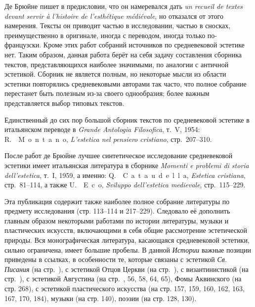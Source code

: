 Де Брюйне пишет в предисловии, что он намеревался дать \emph{un recueil de textes devant servir à l’histoire de l’esthétique médiévale}, но отказался от этого намерения. Тексты он приводит частью в исследовании, частью в сносках, преимущественно в оригинале, иногда с переводом, иногда только по-французски. Кроме этих  работ собраний источников по средневековой эстетике нет. Таким образом, данная работа берёт на себя задачу составления сборника текстов, представляющихся наиболее значимыми, по аналогии с античной эстетикой. Сборник не является полным, но некоторые мысли из области эстетики повторялись средневековыми авторами так часто, что полное собрание перестанет быть полезным из-за своего однообразия; более важным представляется выбор типовых текстов.

Единственный до сих пор большой сборник текстов по средневековой эстетике в итальянском переводе в \textit{Grande Antologia Filosofica}, т.~V, 1954: R.~~M~o~n~t~a~n~o, \textit{L’estetica nel pensiero cristiano}, стр.~207--310.

После работ де Брюйне лучшее синтетическое исследование средневековой эстетики имеет итальянская литература в сборнике \textit{Momenti e problemi di storia dell’estetica}, т.~I, 1959, а именно: Q.~~C~a~t~a~u~d~e~l~l~a,  \textit{Estetica cristiana}, стр.~81--114, а также U.~~E~c~o,  \textit{Sviluppo dell’estetica medievale}, стр.~115--229.

Эта публикация содержит также наиболее полное собрание литературы по предмету исследования (стр. 113--114 и 217--229). Следовало её дополнить главным образом некоторыми работами по истории литературы, музыки и пластических искусств, включающими в себя общие рассмотрение эстетической природы. Вся монографическая литература, касающаяся средневековой эстетики, сильно ограничена, имеет большие пробелы. В данной \emph{Истории} важные позиции приведены в ссылках, в особенности те, которые связаны с эстетикой \emph{Св. Писания} (на стр.~\pageref{sec:pismo_sw}), с эстетикой Отцов Церкви (на стр.~\pageref{sec:greccy}), с византинистикой (на стр.~\pageref{sec:bizantynistyka}), с эстетикой Августина (на стр.~\pageref{subsec:sw_august}, 56, 58, 64, 65), Фомы Аквинского (на стр. 268), с эстетикой пластического искусства (на стр. 157, 159, 160, 162, 163, 167, 170, 184), музыки (на стр. 140), поэзии (на стр. 128, 130).